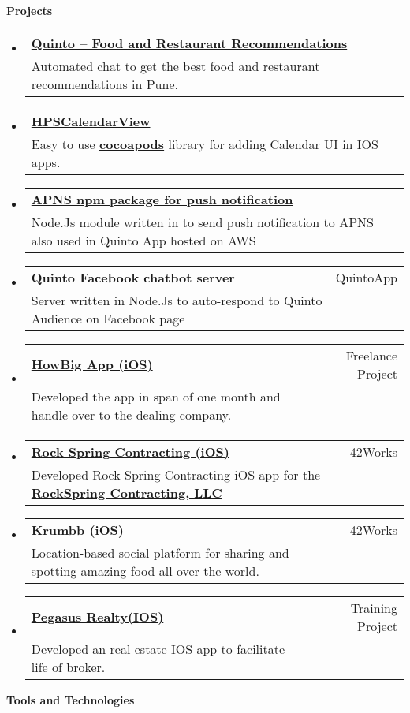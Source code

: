 \documentclass[letterpaper,11pt]{article}
\makeatletter
\newcommand{\resheading}[1]{{\large \colorbox{mygrey}{\begin{minipage}{\textwidth}{\textbf{#1 \vphantom{p\^{E}}}}\end{minipage}}}}
\newcommand{\ressubheading}[3]{
	\begin{tabular*}{6.5in}{l@{\extracolsep{\fill}}r}
			\textbf{#1} & #2\\
			{#3} \\
	\end{tabular*}\vspace{-6pt}
}
\makeatother
\begin{document}
\vspace{5mm} 
\resheading{Projects}
	\begin{itemize}
    \item 
			\ressubheading{\href{https://itunes.apple.com/in/app/quinto-discover-best-food/id912305961?mt=8}{Quinto – Food and Restaurant Recommendations}}{}{Automated chat to get the best food and restaurant recommendations in Pune.}
		\item 
			\ressubheading{\href{https://github.com/harry1064/HPSCalendarView}{HPSCalendarView}}{}{Easy to use \href{https://github.com/harry1064/HPSCalendarView}{\textbf{cocoapods}} library for adding Calendar UI in  IOS apps.}
		\item
			\ressubheading{\href{https://www.npmjs.com/package/apns-http2}{APNS npm package for push notification}}{}{Node.Js module written in  to send push notification to APNS also used in  Quinto App hosted on AWS}
		\item
			\ressubheading{Quinto Facebook chatbot server}{QuintoApp}{Server written in Node.Js to auto-respond to Quinto Audience on Facebook page}	
		\item
			\ressubheading{\href{ https://itunes.apple.com/in/app/howbig-app/id982763195?mt=8}{HowBig App (iOS)}}{Freelance Project}{Developed the app in span of one month and handle over to the dealing company.}	
	   \item
			\ressubheading{\href{  https://itunes.apple.com/in/app/rock-spring-contracting/id1026561788?mt=8}{Rock Spring Contracting (iOS)}}{42Works}{Developed Rock Spring Contracting iOS app for the {\href{http://www.rockspringcontracting.com/}{\textbf{RockSpring Contracting, LLC }}}}                                            \item
			\ressubheading{\href{ https://itunes.apple.com/nz/app/krumbb/id1001546648?mt=8}{Krumbb (iOS)}}{42Works}{Location-based social platform for sharing and spotting amazing food all over the world.}	
		\item
			\ressubheading{\href{ https://itunes.apple.com/us/app/pegasus-realty/id948309965?mt=8}{Pegasus Realty(IOS)}}{Training Project}{Developed an real estate IOS app to facilitate life of broker.}
\end{itemize}  %
\vspace{5mm} 
\resheading{\Large Tools and Technologies}
\end{document}
